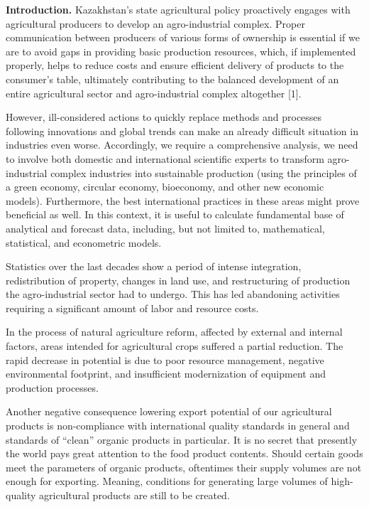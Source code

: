 {\bfseries Introduction.} Kazakhstan's state agricultural policy
proactively engages with agricultural producers to develop an
agro-industrial complex. Proper communication between producers of
various forms of ownership is essential if we are to avoid gaps in
providing basic production resources, which, if implemented properly,
helps to reduce costs and ensure efficient delivery of products to the
consumer's table, ultimately contributing to the balanced development of
an entire agricultural sector and agro-industrial complex altogether
{[}1{]}.

However, ill-considered actions to quickly replace methods and processes
following innovations and global trends can make an already difficult
situation in industries even worse. Accordingly, we require a
comprehensive analysis, we need to involve both domestic and
international scientific experts to transform agro-industrial complex
industries into sustainable production (using the principles of a green
economy, circular economy, bioeconomy, and other new economic models).
Furthermore, the best international practices in these areas might prove
beneficial as well. In this context, it is useful to calculate
fundamental base of analytical and forecast data, including, but not
limited to, mathematical, statistical, and econometric models.

Statistics over the last decades show a period of intense integration,
redistribution of property, changes in land use, and restructuring of
production the agro-industrial sector had to undergo. This has led
abandoning activities requiring a significant amount of labor and
resource costs.

In the process of natural agriculture reform, affected by external and
internal factors, areas intended for agricultural crops suffered a
partial reduction. The rapid decrease in potential is due to poor
resource management, negative environmental footprint, and insufficient
modernization of equipment and production processes.

Another negative consequence lowering export potential of our
agricultural products is non-compliance with international quality
standards in general and standards of ``clean'' organic products in
particular. It is no secret that presently the world pays great
attention to the food product contents. Should certain goods meet the
parameters of organic products, oftentimes their supply volumes are not
enough for exporting. Meaning, conditions for generating large volumes
of high-quality agricultural products are still to be created.

